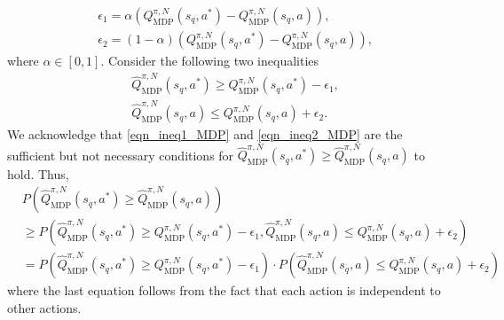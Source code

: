 \begin{myproof}
\begin{align}
    &\epsilon_1 = \alpha \left( Q_\text{MDP}^{\pi, N}(s_q, a^*) - Q_\text{MDP}^{\pi, N}(s_q, a) \right), \\
    &\epsilon_2 = (1 - \alpha) \left( Q_\text{MDP}^{\pi, N}(s_q, a^*) - Q_\text{MDP}^{\pi, N}(s_q, a) \right),
\end{align}
%
%
where $\alpha \in [0, 1]$. Consider the following two inequalities
\begin{align}
    &\hat{Q}_\text{MDP}^{\pi, N}(s_q, a^*) \geq Q_\text{MDP}^{\pi, N}(s_q, a^*) - \epsilon_1 \label{eqn_ineq1_MDP}, \\
    &\hat{Q}_\text{MDP}^{\pi, N}(s_q, a) \leq Q_\text{MDP}^{\pi, N}(s_q, a) + \epsilon_2 \label{eqn_ineq2_MDP}.
\end{align}
%
%
We acknowledge that \eqref{eqn_ineq1_MDP} and \eqref{eqn_ineq2_MDP} are the sufficient but not necessary conditions for $\hat{Q}_\text{MDP}^{\pi, N}(s_q, a^*) \geq \hat{Q}_\text{MDP}^{\pi, N}(s_q, a)$ to hold.
Thus,
\begin{align}
    &P \left( \hat{Q}_\text{MDP}^{\pi, N}(s_q, a^*) \geq \hat{Q}_\text{MDP}^{\pi, N}(s_q, a) \right)  \\
    &\geq P\left( \hat{Q}_\text{MDP}^{\pi, N}(s_q, a^*) \geq Q_\text{MDP}^{\pi, N}(s_q, a^*) - \epsilon_1, \hat{Q}_\text{MDP}^{\pi, N}(s_q, a) \leq Q_\text{MDP}^{\pi, N}(s_q, a) + \epsilon_2 \right) \\
    &=P\left( \hat{Q}_\text{MDP}^{\pi, N}(s_q, a^*) \geq Q_\text{MDP}^{\pi, N}(s_q, a^*) - \epsilon_1 \right) \cdot P \left( \hat{Q}_\text{MDP}^{\pi, N}(s_q, a) \leq Q_\text{MDP}^{\pi, N}(s_q, a) + \epsilon_2 \right) 
\end{align}
%
where the last equation follows from the fact that each action is independent to other actions. 






\end{myproof}
